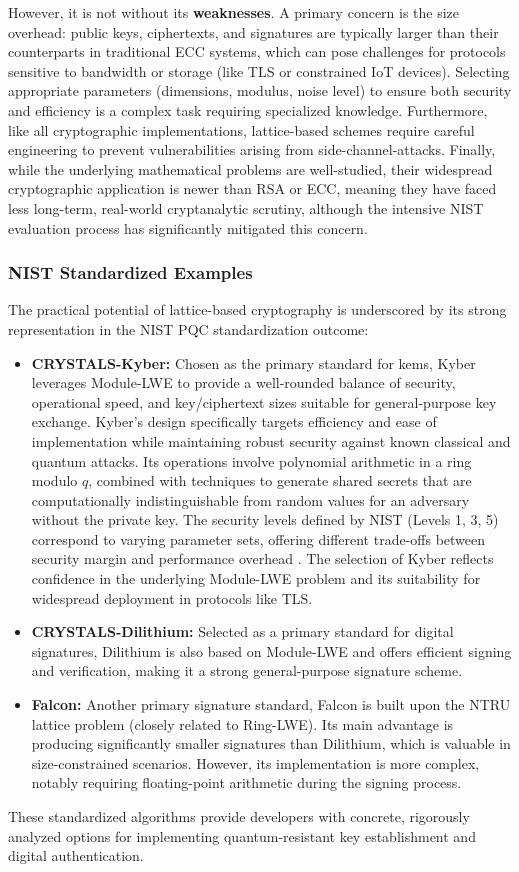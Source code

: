 However, it is not without its \textbf{weaknesses}. A primary concern is the size overhead: public keys, ciphertexts, and signatures are typically larger than their counterparts in traditional ECC systems, which can pose challenges for protocols sensitive to bandwidth or storage (like TLS or constrained IoT devices). Selecting appropriate parameters (dimensions, modulus, noise level) to ensure both security and efficiency is a complex task requiring specialized knowledge. Furthermore, like all cryptographic implementations, lattice-based schemes require careful engineering to prevent vulnerabilities arising from \glspl{side-channel-attack}. Finally, while the underlying mathematical problems are well-studied, their widespread cryptographic application is newer than RSA or ECC, meaning they have faced less long-term, real-world cryptanalytic scrutiny, although the intensive NIST evaluation process has significantly mitigated this concern.

\subsubsection{NIST Standardized Examples}
The practical potential of lattice-based cryptography is underscored by its strong representation in the NIST PQC standardization outcome:
\begin{itemize}
    \item \textbf{CRYSTALS-Kyber:} Chosen as the primary standard for \glspl{kem}, Kyber leverages Module-LWE to provide a well-rounded balance of security, operational speed, and key/ciphertext sizes suitable for general-purpose key exchange. Kyber's design specifically targets efficiency and ease of implementation while maintaining robust security against known classical and quantum attacks. Its operations involve polynomial arithmetic in a ring modulo $q$, combined with techniques to generate shared secrets that are computationally indistinguishable from random values for an adversary without the private key. The security levels defined by NIST (Levels 1, 3, 5) correspond to varying parameter sets, offering different trade-offs between security margin and performance overhead \parencite{nist_pqc_fips_205}. The selection of Kyber reflects confidence in the underlying Module-LWE problem and its suitability for widespread deployment in protocols like TLS.
    \item \textbf{CRYSTALS-Dilithium:} Selected as a primary standard for digital signatures, Dilithium is also based on Module-LWE and offers efficient signing and verification, making it a strong general-purpose signature scheme.
    \item \textbf{Falcon:} Another primary signature standard, Falcon is built upon the NTRU lattice problem (closely related to Ring-LWE). Its main advantage is producing significantly smaller signatures than Dilithium, which is valuable in size-constrained scenarios. However, its implementation is more complex, notably requiring floating-point arithmetic during the signing process.
\end{itemize}
These standardized algorithms provide developers with concrete, rigorously analyzed options for implementing quantum-resistant key establishment and digital authentication.
\newpage

